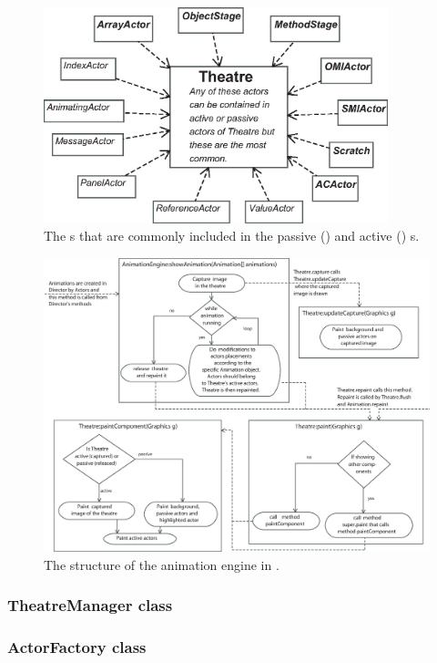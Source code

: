 \begin{figure}[!htb]
\begin{center}
\includegraphics[width=10cm]{images/theatre_and_actors.eps}
\caption{The s that are commonly included in the passive () and active () s.}
\label{fig:theatre_and_actorcontainers}
\end{center}
\end{figure}


\begin{figure}[!htb]
\begin{center}
\includegraphics[width=\textwidth]{images/jeliot_animation_engine3.eps}
\caption{The structure of the animation engine in \jel{}.}
\label{fig:jeliot3_animation_engine}
\end{center}
\end{figure}

\subsubsection{TheatreManager class}


\subsubsection{ActorFactory class}

